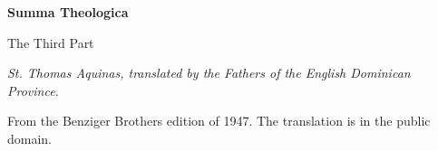 \documentclass[11pt,letterpaper]{article}
\begin{document}
\color{ink}

\begin{titlepage}
\centering
\vspace*{4em}
{\LARGE\bfseries\color{heading} Summa Theologica\par}
\vspace{1.5em}
{\Large\color{subhead} The Third Part\par}
\vspace{2.5em}
{\itshape\color{subhead} St. Thomas Aquinas, translated by the Fathers of
the English Dominican Province.\par}
\vfill
{\small From the Benziger Brothers edition of 1947. The translation is in
the public domain.\par}
\vspace{2em}
\end{titlepage}

\tableofcontents


\end{document}
